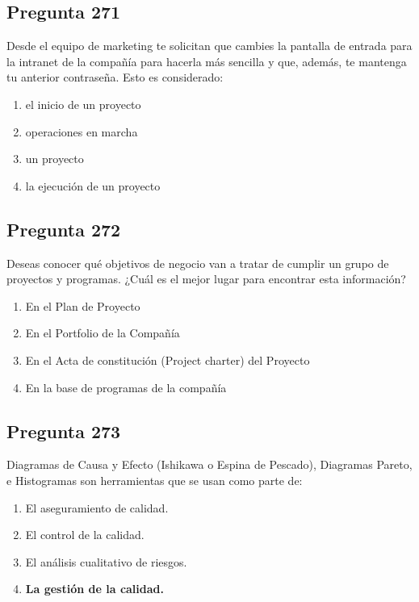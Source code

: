 \documentclass[11pt,a4paper]{article}
\begin{document}
\subsection*{Pregunta 271}
Desde el equipo de marketing te solicitan que cambies la pantalla de entrada para la intranet de la compañía para hacerla más sencilla y que, además, te mantenga tu anterior contraseña. Esto es considerado:

\begin{enumerate}[label=\alph*)]
  \item el inicio de un proyecto
  \item operaciones en marcha
  \item un proyecto
  \item la ejecución de un proyecto
\end{enumerate}

\subsection*{Pregunta 272}
Deseas conocer qué objetivos de negocio van a tratar de cumplir un grupo de proyectos y programas. ¿Cuál es el mejor lugar para encontrar esta información?

\begin{enumerate}[label=\alph*)]
  \item En el Plan de Proyecto
  \item En el Portfolio de la Compañía
  \item En el Acta de constitución (Project charter) del Proyecto
  \item En la base de programas de la compañía
\end{enumerate}

\subsection*{Pregunta 273}
Diagramas de Causa y Efecto (Ishikawa o Espina de Pescado), Diagramas Pareto, e Histogramas son herramientas que se usan como parte de:

\begin{enumerate}[label=\alph*)]
  \item El aseguramiento de calidad.
  \item El control de la calidad.
  \item El análisis cualitativo de riesgos.
  \item \textbf{La gestión de la calidad.}
\end{enumerate}
\end{document}
